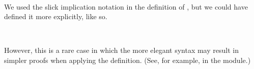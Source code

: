 \documentclass[a4paper,UKenglish,cleveref,autoref,thm-restate,11pt]{lipics-v2021}
\begin{document}
\begin{code}
\AgdaSpace{}%
\AgdaSymbol{)(}\AgdaSpace{}%
\AgdaSymbol{:}\AgdaSpace{}%
\AgdaSpace{}%
\AgdaSpace{}%
\AgdaSymbol{)}\AgdaSpace{}%
\AgdaSpace{}%
\AgdaSpace{}%
\AgdaSpace{}%
\AgdaSpace{}%
\AgdaSpace{}%
\AgdaSpace{}%
\<%
\\
%
\>[1]\AgdaSpace{}%
\AgdaSpace{}%
%
\>[21]\AgdaSymbol{=}\AgdaSpace{}%
\AgdaSymbol{(}\AgdaSpace{}%
\AgdaSymbol{)}\AgdaSpace{}%
\AgdaOperator{\AgdaFunction{=[}}\AgdaSpace{}%
\AgdaSpace{}%
\AgdaOperator{\AgdaFunction{]⇒}}\AgdaSpace{}%
\<%
\end{code}
\ccpad
We used the slick implication notation in the definition of , but we could have defined it more explicitly, like so.
\ccpad
\begin{code}%
\>[0][@{}l@{\AgdaIndent{1}}]%
\>[1]\AgdaSpace{}%
\AgdaSymbol{:}\AgdaSpace{}%
\AgdaSymbol{(}\AgdaSpace{}%
\AgdaSymbol{:}\AgdaSpace{}%
\AgdaSymbol{(}\AgdaSpace{}%
\AgdaSpace{}%
\AgdaSymbol{)}\AgdaSpace{}%
\AgdaSpace{}%
\AgdaSymbol{)(}\AgdaSpace{}%
\AgdaSymbol{:}\AgdaSpace{}%
\AgdaSpace{}%
\AgdaSpace{}%
\AgdaSymbol{)}\AgdaSpace{}%
\AgdaSpace{}%
\AgdaSpace{}%
\AgdaSpace{}%
\AgdaSpace{}%
\AgdaSpace{}%
\AgdaSpace{}%
\<%
\\
%
\>[1]\AgdaSpace{}%
\AgdaSpace{}%
%
\>[22]\AgdaSymbol{=}\AgdaSpace{}%
\AgdaSpace{}%
\AgdaSpace{}%
\AgdaSpace{}%
\AgdaSpace{}%
\AgdaSymbol{(}\AgdaSpace{}%
\AgdaSymbol{)}\AgdaSpace{}%
\AgdaSpace{}%
\AgdaSpace{}%
\AgdaSpace{}%
\AgdaSpace{}%
\AgdaSymbol{(}\AgdaSpace{}%
\AgdaSymbol{)}\AgdaSpace{}%
\AgdaSymbol{(}\AgdaSpace{}%
\AgdaSymbol{)}\<%
\end{code}
\ccpad
However, this is a rare case in which the more elegant syntax may result in simpler proofs when applying the definition. (See, for example,  in the \ualibOperations module.)
\end{document}
